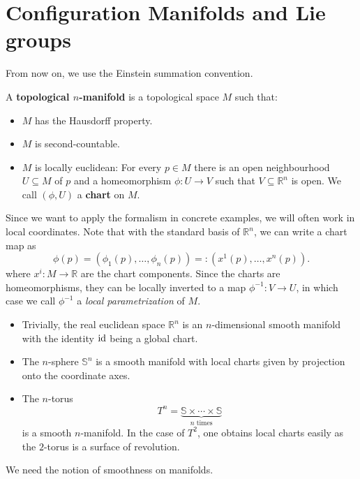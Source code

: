 \section{Configuration Manifolds and Lie groups}
From now on, we use the Einstein summation convention.
\begin{definition}
    A \textbf{topological $n$-manifold} is a topological space $M$ such that:
    \begin{itemize}
        \item $M$ has the Hausdorff property.
        \item $M$ is second-countable.
        \item $M$ is locally euclidean: For every $p \in M$ there is an open neighbourhood $U \subseteq M$ of $p$ and a homeomorphism $\phi: U \to V$ such that $V \subseteq \mathbb{R}^n$ is open. We call $(\phi, U)$ a \textbf{chart} on $M$.
    \end{itemize}
\end{definition}
Since we want to apply the formalism in concrete examples, we will often work in local coordinates. Note that with the standard basis of $\mathbb{R}^n$, we can write a chart map as 
\[
\phi(p)=(\phi_1(p), \dots, \phi_n(p)) =: (x^1(p), \dots, x^n(p))
.\] where $x^i: M \to \mathbb{R}$ are the chart components. Since the charts are homeomorphisms, they can be locally inverted to a map $\phi^{-1}: V \to U$, in which case we call $\phi^{-1}$ a \emph{local parametrization} of $M$.
\begin{eg}
    \begin{itemize}
        \item Trivially, the real euclidean space $\mathbb{R}^n$ is an $n$-dimensional smooth manifold with the identity $\operatorname{id}$ being a global chart.
        \item The $n$-sphere $\mathbb{S}^n$ is a smooth manifold with local charts given by projection onto the coordinate axes.
    \item The $n$-torus \[T^n = \underbrace{\mathbb{S} \times \cdots \times \mathbb{S}}_{n\text{ times}}\] is a smooth $n$-manifold. In the case of $T^2$, one obtains local charts easily as the $2$-torus is a surface of revolution. 
    \end{itemize}
\end{eg}
We need the notion of smoothness on manifolds.
